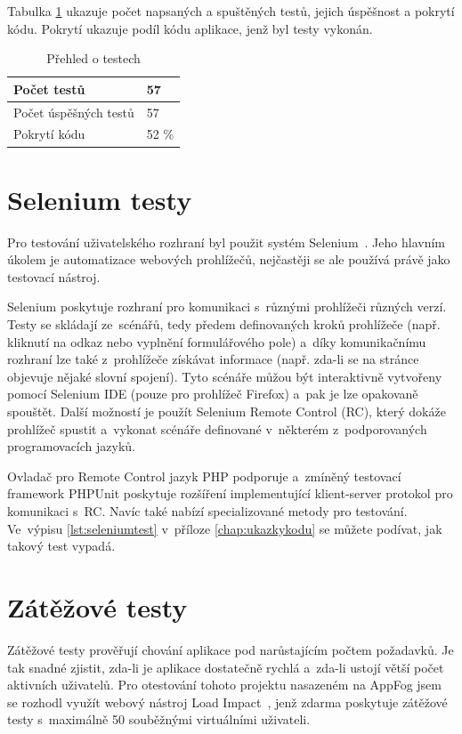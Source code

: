 \documentclass[11pt,twoside,a4paper]{book}
\begin{document}
Tabulka \ref{testtable} ukazuje počet napsaných a spuštěných testů, jejich úspěšnost a pokrytí kódu. Pokrytí ukazuje podíl kódu aplikace, jenž byl testy vykonán.

\begin{table}[H]
    \center \begin{tabular}{|l|l|}
    \hline
    Počet testů           & 57  \\
    \hline
    Počet úspěšných testů & 57  \\
    \hline
    Pokrytí kódu          & 52 \%  \\
    \hline
    \end{tabular}
    \caption{Přehled o testech}
    \label{testtable}
\end{table}


\section{Selenium testy}
Pro testování uživatelského rozhraní byl použit systém Selenium~\cite{selenium}. Jeho hlavním úkolem je automatizace webových prohlížečů, nejčastěji se ale používá právě jako testovací nástroj. 

Selenium poskytuje rozhraní pro komunikaci s~různými prohlížeči různých verzí. Testy se skládají ze~scénářů, tedy předem definovaných kroků prohlížeče (např. kliknutí na odkaz nebo vyplnění formulářového pole) a~díky komunikačnímu rozhraní lze také z~prohlížeče získávat informace (např. zda-li se na stránce objevuje nějaké slovní spojení). Tyto scénáře můžou být interaktivně vytvořeny pomocí Selenium IDE (pouze pro prohlížeč Firefox) a~pak je lze opakovaně spouštět. Další možností je použít Selenium Remote Control (RC), který dokáže prohlížeč spustit a~vykonat scénáře definované v~některém z~podporovaných programovacích jazyků.

Ovladač pro Remote Control jazyk PHP podporuje a~zmíněný testovací framework \mbox{PHPUnit} poskytuje rozšíření imple\-mentující klient-server protokol pro komunikaci s~RC. Navíc také nabízí specializované metody pro testování. Ve~výpisu \ref{lst:seleniumtest} v~příloze \ref{chap:ukazkykodu} se můžete podívat, jak takový test vypadá.


\section{Zátěžové testy}
Zátěžové testy prověřují chování aplikace pod narůstajícím počtem požadavků. Je tak snadné zjistit, zda-li je aplikace dostatečně rychlá a~zda-li ustojí větší počet aktivních uživatelů. Pro otestování tohoto projektu nasazeném na AppFog jsem se rozhodl využít webový nástroj Load Impact~\cite{loadimpact}, jenž zdarma poskytuje zátěžové testy s~maximálně 50 souběžnými virtuálními uživateli. 
\end{document}
